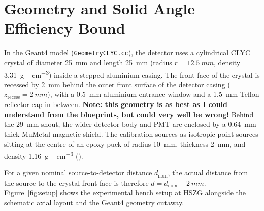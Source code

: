 \documentclass[11pt,a4paper]{article}
\begin{document}
\begin{abstract}
\noindent\textbf{Spectral shape}
Using the experimental data, a simple model for the detector resolution was determined and implemented in the simulation.
This used data from the distance variation study, i.e.,  and .
The \SI{661.64}{keV} and \SI{1332.51}{keV} lines gives a detector energy resolution of $R(E)=(123.9\pm0.4)/\sqrt{E/\mathrm{keV}}\,\%$ (i.e., FWHM $=1.239\sqrt{E/\mathrm{keV}}\,\mathrm{keV}$).
When applied to the simulated data and plotted against the experimental spectra, the agreement is quite close within the photopeak and Compton edge region, however a large deviation exists at low energies, likely due to an absence of back-scattering materials in the G4 model.
\end{abstract}

\section{Geometry and Solid Angle Efficiency Bound}

In the Geant4 model (\texttt{GeometryCLYC.cc}), the detector uses a cylindrical CLYC crystal of diameter \SI{25}{mm} and length \SI{25}{mm} (radius $r=\SI{12.5}{mm}$, density \SI{3.31}{g\,cm^{-3}}) inside a stepped aluminium casing. 
The front face of the crystal is recessed by \SI{2}{mm} behind the outer front surface of the detector casing ($z_{\mathrm{recess}}=\SI{2}{mm}$), with a \SI{0.5}{mm} aluminium entrance window and a \SI{1.5}{mm} Teflon reflector cap in between. 
\textbf{Note: this geometry is as best as I could understand from the blueprints, but could very well be wrong!}
Behind the \SI{29}{mm} snout, the wider detector body and PMT are enclosed by a \SI{0.64}{mm}-thick MuMetal magnetic shield. 
The calibration sources as isotropic point sources sitting at the centre of an epoxy puck of radius \SI{10}{mm}, thickness \SI{2}{mm}, and density \SI{1.16}{g\,cm^{-3}} ().

For a given nominal source-to-detector distance $d_{\mathrm{nom}}$, the actual distance from the source to the crystal front face is therefore $d=d_{\mathrm{nom}}+\SI{2}{mm}$. Figure~\ref{fig:setup} shows the experimental bench setup at HSZG alongside the schematic axial layout and the Geant4 geometry cutaway.
\end{document}

